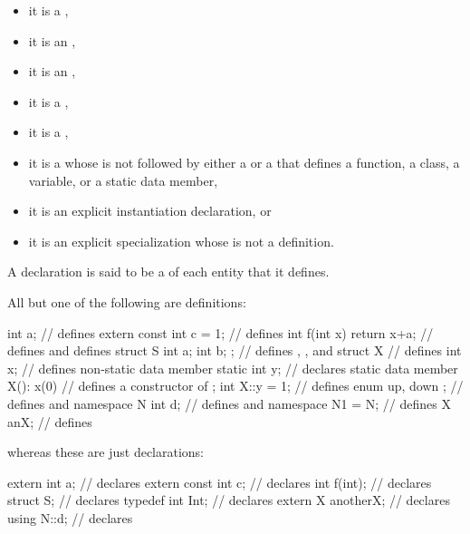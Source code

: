 \begin{itemize}
\item it is
a ,
\item
it is an
,
\item
it is an
,
\item it is
a ,
\item it is
a ,
\item it is
a 
whose  is not followed by
either a  or a 
that defines a function, a class, a variable, or a static data member,
\item it is
an explicit instantiation declaration, or
\item it is
an explicit specialization whose
 is not a definition.
\end{itemize}
A declaration is said to be a  of each entity that it defines.
\begin{example}
All but one of the following are definitions:
\begin{codeblock}
int a;                          // defines 
extern const int c = 1;         // defines 
int f(int x) { return x+a; }    // defines  and defines 
struct S { int a; int b; };     // defines , , and 
struct X {                      // defines 
  int x;                        // defines non-static data member 
  static int y;                 // declares static data member 
  X(): x(0) { }                 // defines a constructor of 
};
int X::y = 1;                   // defines 
enum { up, down };              // defines  and 
namespace N { int d; }          // defines  and 
namespace N1 = N;               // defines 
X anX;                          // defines 

\end{codeblock}
whereas these are just declarations:
\begin{codeblock}
extern int a;                   // declares 
extern const int c;             // declares 
int f(int);                     // declares 
struct S;                       // declares 
typedef int Int;                // declares 
extern X anotherX;              // declares 
using N::d;                     // declares 
\end{codeblock}
\end{example}

